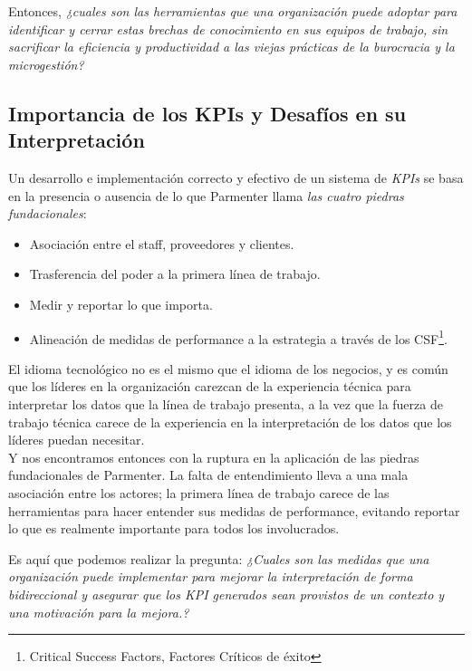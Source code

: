 \documentclass[journal]{IEEEtran}
\begin{document}
Entonces, \textit{¿cuales son las herramientas que una organización puede adoptar para identificar y cerrar estas brechas de conocimiento en sus equipos de trabajo, sin sacrificar la eficiencia y productividad a las viejas prácticas de la burocracia y la microgestión?}

\subsection{\textbf{Importancia de los KPIs y Desafíos en su Interpretación}}

Un desarrollo e implementación correcto y efectivo de un sistema de \textit{KPIs} se basa en la presencia o ausencia de lo que Parmenter llama \textit{las cuatro piedras fundacionales}\cite[Chapter 2. Foundation Stones for Implementing Key Performance Indicators]{parmenter2015key}:
\begin{itemize}
    \item Asociación entre el staff, proveedores y clientes.
    \item Trasferencia del poder a la primera línea de trabajo.
    \item Medir y reportar lo que importa.
    \item Alineación de medidas de performance a la estrategia a través de los CSF\footnote{Critical Success Factors, Factores Críticos de éxito}.
\end{itemize}
El idioma tecnológico no es el mismo que el idioma de los negocios, y es común que los líderes en la organización carezcan de la experiencia técnica para interpretar los datos que la línea de trabajo presenta, a la vez que la fuerza de trabajo técnica carece de la experiencia en la interpretación de los datos que los líderes puedan necesitar.
\\Y nos encontramos entonces con la ruptura en la aplicación de las piedras fundacionales de Parmenter. La falta de entendimiento lleva a una mala asociación entre los actores; la primera línea de trabajo carece de las herramientas para hacer entender sus medidas de performance, evitando reportar lo que es realmente importante para todos los involucrados.

Es aquí que podemos realizar la pregunta: \textit{¿Cuales son las medidas que una organización puede implementar para mejorar la interpretación de forma bidireccional y asegurar que los \textit{KPI} generados sean provistos de un contexto y una motivación para la mejora\cite[Chapter 1. Key Performance Indicators]{parmenter2015key}.?}
\end{document}
